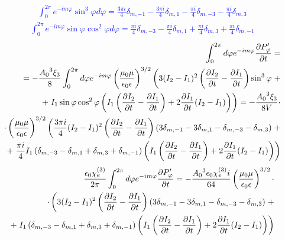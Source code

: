 %
\textcolor{blue} { \begin{equation*} \begin{aligned}
\int_{0}^{2\pi} e^{-i m \varphi} \sin^3 \varphi d \varphi = 
\frac{3 \pi i}{4} \delta_{m,-1} - \frac{3 \pi i}{4} \delta_{m,1} - 
\frac{\pi i}{4} \delta_{m,-3} - \frac{\pi i}{4} \delta_{m,3}
\end{aligned} \end{equation*} }
%
\textcolor{blue} { \begin{equation*} \begin{aligned}
\int_{0}^{2\pi} e^{-i m \varphi} \sin \varphi \cos^2 \varphi d \varphi = 
\frac{\pi i }{4} \delta_{m,-3} - \frac{\pi i }{4} \delta_{m,1} + 
\frac{\pi i }{4} \delta_{m,3} + \frac{\pi i }{4} \delta_{m,-1}
\end{aligned} \end{equation*} }
%
\textcolor{blue} { \begin{equation*} \begin{aligned}
\int_{0}^{2 \pi} d \varphi e^{-im \varphi} \frac{\partial P_\varphi^\prime}{\partial t} = \\
= - \frac{ {A_0}^3 \xi_3 }{ 8 } \int_{0}^{2 \pi} d \varphi e^{-im \varphi}
\left( \frac{\mu_0 \mu} {\epsilon_0 \epsilon} \right)^{3/2} \left(
3 ( I_2 - I_1 )^2 \left( \frac{\partial I_2}{\partial t} - \frac{\partial I_1}{\partial t} \right)
\sin^3 \varphi \right. + \\
+ \left. I_1 \sin \varphi \cos^2 \varphi \left( 
I_1 \left( \frac{\partial I_2}{\partial t} - \frac{\partial I_1}{\partial t} \right) + 
2 \frac{\partial I_1}{\partial t} (I_2 - I_1) \right) \right) = 
- \frac{ {A_0}^3 \xi_3 }{ 8 V } \cdot \\ 
\cdot \left( \frac{\mu_0 \mu} {\epsilon_0 \epsilon} \right)^{3/2} \left(
\frac{3 \pi i}{4} ( I_2 - I_1 )^2 \left( \frac{\partial I_2}{\partial t} - 
\frac{\partial I_1}{\partial t} \right) \left( 3 \delta_{m,-1} - 3 \delta_{m,1} - 
\delta_{m,-3} - \delta_{m,3} \right) \right. + \\
+ \left. \frac{\pi i}{4} I_1 \left(  \delta_{m,-3} - \delta_{m,1} + 
\delta_{m,3} + \delta_{m,-1} \right) \left( 
I_1 \left( \frac{\partial I_2}{\partial t} - \frac{\partial I_1}{\partial t} \right) + 
2 \frac{\partial I_1}{\partial t} (I_2 - I_1) \right) \right)
\end{aligned} \end{equation*} }
%
\begin{equation*} \begin{aligned}
\frac{\epsilon_0 \chi_e^{(3)}}{2 \pi} \int_{0}^{2 \pi} d \varphi 
e^{-im \varphi} \frac{\partial P_\varphi^\prime}{\partial t} = 
- \frac{ {A_0}^3 \epsilon_0 \chi_e^{(3)}  i}{ 64 }
\left( \frac{\mu_0 \mu} {\epsilon_0 \epsilon} \right)^{3/2} \cdot \\ 
\cdot \left( 3 ( I_2 - I_1 )^2 \left( \frac{\partial I_2}{\partial t} - 
\frac{\partial I_1}{\partial t} \right) \left( 3 \delta_{m,-1} - 3 \delta_{m,1} - 
\delta_{m,-3} - \delta_{m,3} \right) \right. + \\
+ \left. I_1 \left(  \delta_{m,-3} - \delta_{m,1} + 
\delta_{m,3} + \delta_{m,-1} \right) \left( 
I_1 \left( \frac{\partial I_2}{\partial t} - \frac{\partial I_1}{\partial t} \right) + 
2 \frac{\partial I_1}{\partial t} (I_2 - I_1) \right) \right)
\end{aligned} \end{equation*}

